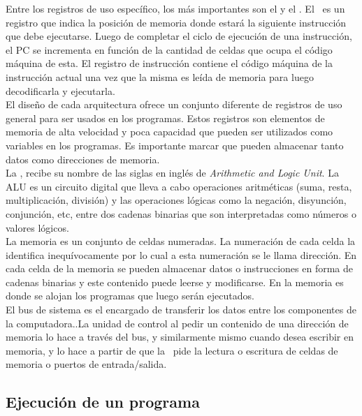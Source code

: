 Entre los registros de uso específico, los más importantes son el \textbf{\PC} y el \textbf{\IR}. El \PC\ es un registro que indica la posición de memoria donde estará la siguiente instrucción que debe ejecutarse. Luego de completar el ciclo de ejecución de una instrucción, el PC se incrementa en función de la cantidad de celdas que ocupa el código máquina de esta. El registro de instrucción contiene el código máquina de la instrucción actual una vez que la misma es leída de memoria para luego decodificarla y ejecutarla.\\

El diseño de cada arquitectura ofrece un conjunto diferente de registros de uso general para ser usados en los programas. Estos registros son elementos de memoria de alta velocidad y poca capacidad que pueden ser utilizados como variables en los programas. Es importante marcar que pueden almacenar tanto datos como direcciones de memoria.\\

La \ALU, recibe su nombre de las siglas en inglés de \textit{Arithmetic and Logic Unit}. La ALU es un circuito digital que lleva a cabo operaciones aritméticas (suma, resta, multiplicación, división) y las operaciones lógicas como la negación, disyunción, conjunción, etc, entre dos cadenas binarias que son interpretadas como números o valores lógicos.\\

La memoria es un conjunto de celdas numeradas. La numeración de cada celda la identifica inequívocamente por lo cual a esta numeración se le llama dirección. En cada celda de la memoria se pueden almacenar datos o instrucciones en forma de cadenas binarias y este contenido puede leerse y modificarse. En la memoria es donde se alojan los programas que luego serán ejecutados.\\

El bus de sistema es el encargado de transferir los datos entre los componentes de la computadora..La unidad de control al pedir un contenido de una dirección de memoria lo hace a través del bus, y similarmente mismo cuando desea escribir en memoria, y lo hace a partir de que la \UC\ pide la lectura o escritura de celdas de memoria o puertos de entrada/salida.

\subsection{Ejecución de un programa}


